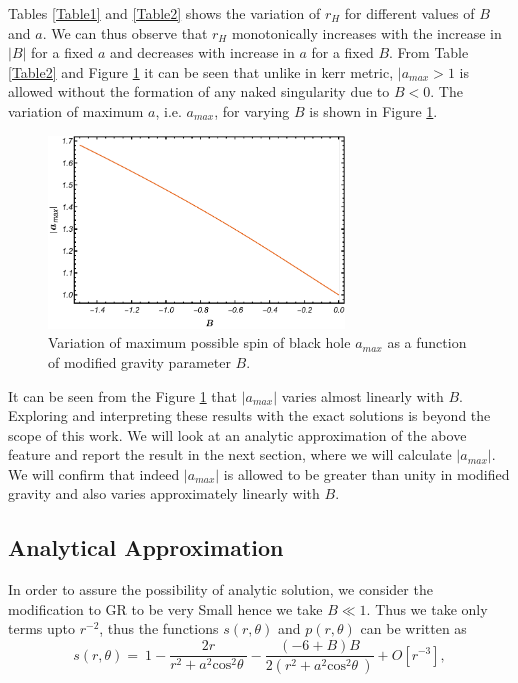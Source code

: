 \documentclass[12pt,a4paper,oneside]{book}
\newcommand{\eq}[2]{\begin{equation} \label{eq:#1} #2 \end{equation}}
\begin{document}
Tables \ref{Table1} and \ref{Table2} shows the variation of $r_H$ for different values of $B$ and $a$. We can thus observe that $r_H$ monotonically increases with the increase in $|B|$ for a fixed $a$ and decreases with increase in $a$ for a fixed $B$. From Table \ref{Table2} and Figure \ref{a_max_VS_B_Fig} it can be seen that unlike in kerr metric, $|a_{max}>1$ is allowed without the formation of any naked singularity due to $B<0$. The variation of maximum $a$, i.e. $a_{max}$, for varying $B$ is shown in Figure \ref{a_max_VS_B_Fig}.
\begin{figure}[H]
\centering
    \includegraphics[width=0.7\textwidth]{a_max_VS_B.pdf}
    \caption{\centering Variation of maximum possible spin of black hole $a_{max}$ as a function of modified
	gravity parameter $B$.}
    \label{a_max_VS_B_Fig}
\end{figure}
It can be seen from the Figure \ref{a_max_VS_B_Fig} that $|a_{max}|$ varies almost linearly with $B$. Exploring and interpreting these results with the exact solutions is beyond the scope of this work. We will look at an analytic approximation of the above feature and report the result in the next section, where we will calculate $|a_{max}|$. We will confirm that 
indeed $|a_{max}|$ is allowed to be greater than unity in modified gravity and also varies approximately linearly with $B$.
\subsection{Analytical Approximation}
In order to assure the possibility of analytic solution, we consider the modification to GR to be very Small hence we take $B\ll1$. Thus we take only terms upto $r^{-2}$, thus the functions $s(r,\theta)$ and $p(r,\theta)$ can be written as
\eq{app_s_r_theta}{
	s\left(r,\theta \right)=\ 1-\frac{2r}{r^2+a^2{{\mathrm{cos}}^{\mathrm{2}} \theta \ }}-\frac{\left(-6+B\right)B}{2\left(r^2+a^2{{\mathrm{cos}}^{\mathrm{2}} \theta \ }\right)}+O[r^{-3}],}
\end{document}
